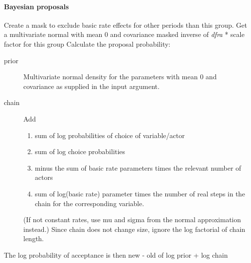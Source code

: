\documentclass[12pt,a4paper]{article}
\renewcommand{\=}{\,=\,}
\newcommand{\+}{\,+\,}
\newcommand{\nnm}[1]{\textsf{\small\textit{#1}}}
\begin{document}
\paragraph{Bayesian proposals}
\label{sec:prop}
\begin{algorithmic}
\STATE Create a mask to exclude basic rate effects for other periods than this
group.
\STATE Get a multivariate normal with mean 0 and covariance masked inverse of
\nnm{dfra} * scale factor for this group
\STATE Calculate the proposal probability:
\begin{description}
\item[prior] Multivariate normal density for the parameters with mean 0
  and covariance as supplied in the input argument.
\item[chain] Add
\begin{enumerate}
\item sum of log probabilities of choice of variable/actor
\item sum of log choice probabilities
\item minus the sum of basic rate parameters times the
relevant number of actors
\item sum of log(basic rate) parameter times the
number of real steps in the chain for the corresponding variable.
\end{enumerate}
(If not constant rates, use mu and sigma from the normal approximation instead.)
Since chain does not change size, ignore the log factorial of chain length.
\end{description}
\STATE The log probability of acceptance is then new - old  of log prior +
log chain
\ENDFOR
\end{algorithmic}
\end{document}
